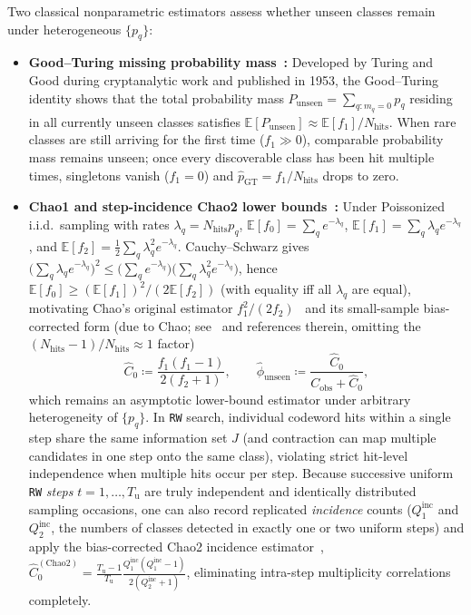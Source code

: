 \documentclass[12pt]{article}
\theoremstyle{definition}
\newcommand{\E}{\mathbb{E}}
\newcommand{\ttt}[1]{\texttt{#1}}
\begin{document}
Two classical nonparametric estimators assess whether unseen classes remain under heterogeneous $\{p_q\}$:
\begin{itemize}
  \item \textbf{Good--Turing missing probability mass~\cite{Good1953}:} Developed by Turing and Good during
    cryptanalytic work and published in 1953, the Good--Turing identity shows that the total probability mass
    $P_{\mathrm{unseen}} = \sum_{q : m_q = 0} p_q$ residing in all currently unseen classes satisfies
    $\E[P_{\mathrm{unseen}}] \approx \E[f_1] / N_{\mathrm{hits}}$. When rare classes are still arriving for the
    first time ($f_1 \gg 0$), comparable probability mass remains unseen; once every discoverable class has been
    hit multiple times, singletons vanish ($f_1 = 0$) and $\hat{p}_{\mathrm{GT}} = f_1 / N_{\mathrm{hits}}$ drops
    to zero.
  \item \textbf{Chao1 and step-incidence Chao2 lower bounds~\cite{Chao1984,Chao1987,ChiuWangWaltherChao2014}:}
    Under Poissonized i.i.d.\ sampling with rates $\lambda_q = N_{\mathrm{hits}} p_q$, $\E[f_0] = \sum_q
    e^{-\lambda_q}$, $\E[f_1] = \sum_q \lambda_q e^{-\lambda_q}$, and $\E[f_2] = \frac{1}{2}\sum_q \lambda_q^2
    e^{-\lambda_q}$. Cauchy--Schwarz gives $\bigl(\sum_q \lambda_q e^{-\lambda_q}\bigr)^2 \le \bigl(\sum_q
    e^{-\lambda_q}\bigr)\bigl(\sum_q \lambda_q^2 e^{-\lambda_q}\bigr)$, hence $\E[f_0] \ge (\E[f_1])^2 / (2
    \E[f_2])$ (with equality iff all $\lambda_q$ are equal), motivating Chao's original estimator $f_1^2 /
    (2 f_2)$~\cite{Chao1984} and its small-sample bias-corrected form (due to Chao; see~\cite{ChiuWangWaltherChao2014}
    and references therein, omitting the $(N_{\mathrm{hits}} - 1)/N_{\mathrm{hits}} \approx 1$ factor)
    \begin{equation}\label{eq:chao1_bg}
      \hat{C}_0 \coloneqq \frac{f_1 (f_1 - 1)}{2 (f_2 + 1)}, \qquad
      \hat{\phi}_{\mathrm{unseen}} \coloneqq \frac{\hat{C}_0}{C_{\mathrm{obs}} + \hat{C}_0},
    \end{equation}
    which remains an asymptotic lower-bound estimator under arbitrary heterogeneity of $\{p_q\}$. In \ttt{RW}
    search, individual codeword hits within a single step share the same information set $J$ (and contraction can
    map multiple candidates in one step onto the same class), violating strict hit-level independence when multiple
    hits occur per step. Because successive uniform \ttt{RW} \emph{steps} $t = 1, \dots, T_{\mathrm{u}}$ are truly
    independent and identically distributed sampling occasions, one can also record replicated \emph{incidence}
    counts ($Q_1^{\mathrm{inc}}$ and $Q_2^{\mathrm{inc}}$, the numbers of classes detected in exactly one or two
    uniform steps) and apply the bias-corrected Chao2 incidence estimator~\cite{Chao1987,ChiuWangWaltherChao2014},
    $\hat{C}_0^{(\mathrm{Chao2})} = \frac{T_{\mathrm{u}} - 1}{T_{\mathrm{u}}} \frac{Q_1^{\mathrm{inc}}
    (Q_1^{\mathrm{inc}} - 1)}{2(Q_2^{\mathrm{inc}} + 1)}$,
    eliminating intra-step multiplicity correlations completely.
\end{itemize}
\end{document}
